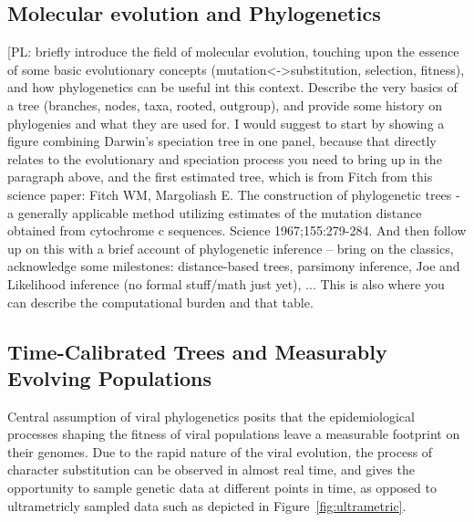 \subsection{Molecular evolution and Phylogenetics}

[PL: briefly introduce the field of molecular evolution, touching upon the essence of some basic evolutionary concepts (mutation<->substitution, selection, fitness), and how phylogenetics can be useful int this context. 
Describe the very basics of a tree (branches, nodes, taxa, rooted, outgroup), and provide some history on phylogenies and what they are used for. I would suggest to start by showing a figure combining Darwin's speciation tree in one panel, because that directly relates to the evolutionary and speciation process you need to bring up in the paragraph above, and the first estimated tree, which is from Fitch from this science paper:
Fitch WM, Margoliash E. The construction of phylogenetic trees - a generally applicable method utilizing estimates of the mutation distance obtained from cytochrome c sequences. Science 1967;155:279-284.
And then follow up on this with a brief account of phylogenetic inference -- bring on the classics, acknowledge some milestones: distance-based trees, parsimony inference, Joe and Likelihood inference (no formal stuff/math just yet), ...
This is also where you can describe the computational burden and that table.



\subsection{Time-Calibrated Trees and Measurably Evolving Populations}


Central assumption of viral phylogenetics posits that the epidemiological processes shaping the fitness of viral populations leave a measurable footprint on their genomes.
Due to the rapid nature of the viral evolution, the process of character substitution can be observed in almost real time, and gives the opportunity to sample genetic data at different points in time, as opposed to ultrametricly sampled data such as depicted in Figure~\ref{fig:ultrametric}.

